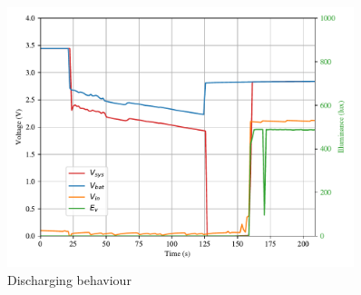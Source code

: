 \begin{figure}[h]
	\centering
	\includegraphics[width=0.9\textwidth]{4-development/hardware/graphics/entladen.pdf}
	\caption{Discharging behaviour\label{development:discharge}}
\end{figure}